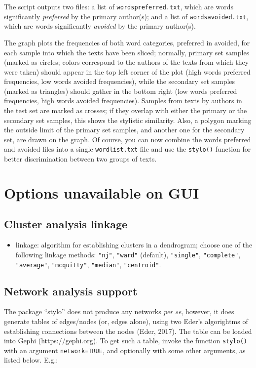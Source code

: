 \documentclass[11pt,a4paper]{article}
\def\underscore{\raisebox{-.8ex}{-}}
\def\margin#1{\marginpar{\textcolor{blue}{\footnotesize\tt #1}}}
\def\code#1{{\tt #1}}
\begin{document}
The script outputs two files: a list of \code{words\underscore{}preferred.txt},
which are words significantly \textit{preferred} by the primary author(s);
and a list of \code{words\underscore{}avoided.txt}, which are
words significantly \textit{avoided} by the primary author(s).

The graph plots the frequencies of both word categories, preferred
in avoided, for each sample into which the texts have been sliced;
normally, primary set samples (marked as circles; colors correspond
to the authors of the texts from which they were taken) should appear
in the top left corner of the plot (high words preferred frequencies,
low words avoided frequencies), while the secondary set samples (marked
as triangles) should gather in the bottom right (low words preferred
frequencies, high words avoided frequencies). Samples from texts by
authors in the test set are marked as crosses; if they overlap with
either the primary or the secondary set samples, this shows the stylistic
similarity. Also, a polygon marking the outside limit of the primary
set samples, and another one for the secondary set, are drawn on the
graph. Of course, you can now combine the words preferred and avoided 
files into a single \code{wordlist.txt} file and use the \code{stylo()} 
function for better discrimination between two groups of texts.

\section{Options unavailable on GUI}

\subsection{Cluster analysis linkage}

\begin{itemize}
\item linkage:\margin{linkage=} algorithm for establishing clusters in a dendrogram;  choose one of the following linkage methods: \code{"nj"}, \code{"ward"} (default), \code{"single"}, \code{"complete"}, \code{"average"},  \code{"mcquitty"}, \code{"median"}, \code{"centroid"}.
\end{itemize}

\subsection{Network analysis support}

The package ``stylo'' does not produce any networks {\it per se}, however, 
it does generate tables of edges/nodes (or, edges alone), using two Eder's 
algorightms of establishing connections between the nodes (Eder, 2017). 
The table can be loaded into Gephi (https://gephi.org). To get such a table, 
invoke the function \code{stylo()} with an argument \code{network=TRUE}, 
and optionally with some other arguments, as listed below. E.g.:
\end{document}
